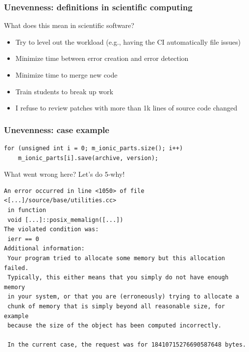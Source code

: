 \documentclass[8pt]{beamer}
\begin{document}
\begin{frame}
  \frametitle{Unevenness: definitions in scientific computing}

  What does this mean in scientific software?

  \vfill

  \begin{itemize}
    \item Try to level out the workload (e.g., having the CI automatically file issues)
    \item Minimize time between error creation and error detection
    \item Minimize time to merge new code
    \item Train students to break up work
    \item I refuse to review patches with more than 1k lines of source code changed
  \end{itemize}
\end{frame}

\begin{frame}[fragile]
  \frametitle{Unevenness: case example}

  \begin{verbatim}
for (unsigned int i = 0; m_ionic_parts.size(); i++)
    m_ionic_parts[i].save(archive, version);
  \end{verbatim}

  What went wrong here? Let's do 5-why!

  \vfill

  {\small
  \begin{verbatim}
An error occurred in line <1050> of file <[...]/source/base/utilities.cc>
 in function
 void [...]::posix_memalign([...])
The violated condition was:
 ierr == 0
Additional information:
 Your program tried to allocate some memory but this allocation failed.
 Typically, this either means that you simply do not have enough memory
 in your system, or that you are (erroneously) trying to allocate a
 chunk of memory that is simply beyond all reasonable size, for example
 because the size of the object has been computed incorrectly.

 In the current case, the request was for 18410715276690587648 bytes.
  \end{verbatim}
  }
\end{frame}
\end{document}
